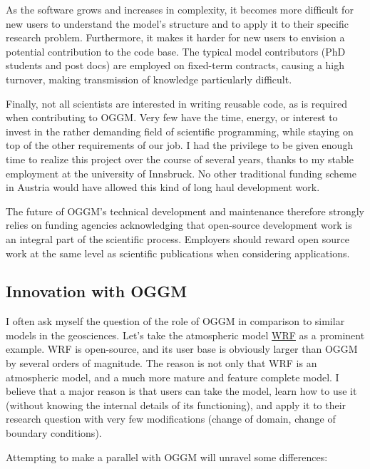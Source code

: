 As the software grows and increases in complexity, it becomes more difficult for new users to understand the model’s
structure and to apply it to their specific research problem. Furthermore, it makes it harder for new users to
envision a potential contribution to the code base. The typical model contributors (PhD students and post docs) are
employed on fixed-term contracts, causing a high turnover, making transmission of knowledge particularly difficult.

Finally, not all scientists are interested in writing reusable code, as is required when contributing to OGGM.
Very few have the time, energy, or interest to invest in the rather demanding field of scientific programming,
while staying on top of the other requirements of our job. I had the privilege to be given enough time to realize this
project over the course of several years, thanks to my stable employment at the university of Innsbruck. No other
traditional funding scheme in Austria would have allowed this kind of long haul development work.

The future of OGGM’s technical development and maintenance therefore strongly relies on funding agencies
acknowledging that open-source development work is an integral part of the scientific process. Employers should reward
open source work at the same level as scientific publications when considering applications.


\subsection{Innovation with OGGM}

I often ask myself the question of the role of OGGM in comparison to similar models in the geosciences.
Let’s take the atmospheric model \href{https://www.mmm.ucar.edu/weather-research-and-forecasting-model}{WRF}
as a prominent example. WRF is open-source, and its user base is obviously larger than OGGM by several orders of
magnitude. The reason is not only that WRF is an atmospheric model, and a much more mature and feature complete model.
I believe that a major reason is that users can take the model, learn how to use it (without knowing the internal
details of its functioning), and apply it to their research question with very few modifications (change of domain,
change of boundary conditions).

Attempting to make a parallel with OGGM will unravel some differences:

